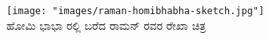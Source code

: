 

 \texttt{[image: "images/raman-homibhabha-sketch.jpg"]}\\ಹೋಮಿ ಭಾಭಾ ರಲ್ಲಿ ಬರೆದ ರಾಮನ್ ರವರ ರೇಖಾ ಚಿತ್ರ

